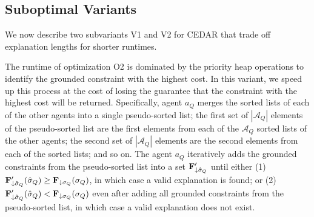 \documentclass[twoside,11pt]{article}
\begin{document}


\subsection{Suboptimal Variants}

We now describe two subvariants V1 and V2 for CEDAR that trade off explanation lengths for shorter runtimes. %

 The runtime of optimization O2 is dominated by the priority heap operations to identify the grounded constraint with the highest cost. In this variant, we speed up this process at the cost of losing the guarantee that the constraint with the highest cost will be returned. Specifically, agent $a_Q$ merges the sorted lists of each of the other agents into a single pseudo-sorted list; the first set of $|\mathcal{A}_Q|$ elements of the pseudo-sorted list are the first elements from each of the $\mathcal{A}_Q$ sorted lists of the other agents; the second set of $|\mathcal{A}_Q|$ elements are the second elements from each of the sorted lists; and so on. The agent $a_Q$ iteratively adds the grounded constraints from the pseudo-sorted list into a set ${\bf{F}}'_{\downarrow \hat{\sigma}_Q}$ until either (1)~${\bf{F}}'_{\downarrow \hat{\sigma}_Q}(\hat{\sigma}_Q) \geq {\bf{F}}_{\downarrow \sigma_Q}(\sigma_Q)$, in which case a valid explanation is found; or (2)~${\bf{F}}'_{\downarrow \hat{\sigma}_Q}(\hat{\sigma}_Q) < {\bf{F}}_{\downarrow \sigma_Q}(\sigma_Q)$ even after adding all grounded constraints from the pseudo-sorted list, in which case a valid explanation does not exist. 
\end{document}
